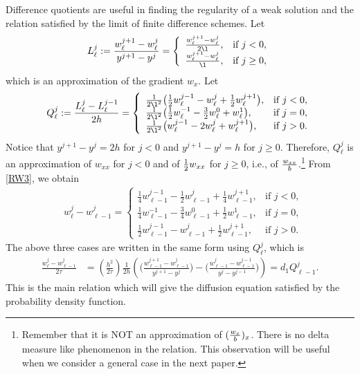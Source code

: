 \documentclass[11pt]{amsart}
\begin{document}
Difference quotients are useful in finding the regularity of a weak solution and the relation satisfied by the limit of finite difference schemes. Let
\begin{equation}\label{Ljl}
L^j_\ell := \frac{w_\ell^{j+1}-w_\ell^j}{y^{j+1}-y^j}
        =\left\{\begin{array}{ll}
        \frac{w^{j+1}_{\ell} - w^{j}_{\ell}}{2\l}, & \text{if $j<0$},\\
        \frac{w^{j+1}_{\ell} - w^{j}_{\ell}}{\l}, & \text{if }  j\ge0,
        \end{array}\right.
\end{equation}
which is an approximation of the gradient $w_x$. Let
\begin{equation}\label{Qjl}
Q^j_\ell := \frac{L^j_\ell-L^{j-1}_\ell}{2h}= \left\{\begin{array}{ll}
        \frac{1}{2\l^2}\big( \frac{1}{2} w^{j-1} _{\ell} - w ^{j} _{\ell} +
        \frac{1}{2} w^{j+1} _{\ell}\big), & \text{if $j<0$},\\
        \frac{1}{2\l^2}\big( \frac{1}{2} w^{-1} _{\ell} - \frac{3}{2}w
        ^{0} _{\ell} +w^{1} _{\ell}\big), & \text{if $j=0$},\\
        \frac{1}{2\l^2}\big(w^{j-1} _{\ell} - 2w^j_\ell + w ^{j+1}
        _{\ell}\big), & \text{if $j>0$}.
        \end{array}\right.
\end{equation}
Notice that $y^{j+1}-y^{j}=2h$ for $j<0$ and $y^{j+1}-y^{j}=h$ for $j\ge0$. Therefore, $Q^j_\ell$ is an approximation of $w_{xx}$ for $j<0$ and of ${1\over2}w_{xx}$ for $j\ge0$, i.e., of ${w_{xx}\over b}$.\footnote{Remember that it is NOT an approximation of $({w_x\over b})_x$. There is no delta measure like phenomenon in the relation. This observation will be useful when we consider a general case in the next paper.} From \eqref{RW3}, we obtain
$$
\begin{aligned}
    &w^{j}_\ell-w^{j}_{\ell-1} = \left\{\begin{array}{ll}
        \frac{1}{4}w^{j-1} _{\ell-1} - \frac{1}{2}w ^{j} _{\ell-1} +
        \frac{1}{4} w^{j+1}_{\ell-1}, & \text{if $j<0$},\\
        \frac{1}{4}w^{-1} _{\ell-1} - \frac{3}{4}w^{0} _{\ell-1} +
        \frac{1}{2}w ^{1} _{\ell-1}, & \text{if $j=0$},\\
        \frac{1}{2}w^{j-1} _{\ell-1}-w^{j}_{\ell-1} + \frac{1}{2}w ^{j+1}
        _{\ell-1}, & \text{if } j>0.
        \end{array}\right.
\end{aligned}
$$
The above three cases are written in the same form using $Q_\ell^j$, which is
\begin{equation} \label{RW1w}
\begin{aligned}
 \frac{w^j_\ell - w^j_{\ell-1}}{2\tau} &= \left(\frac{h^2}{2\tau}\right)
 \frac{1}{2h}\left( \Big(\tfrac{w^{j+1}_{\ell-1} -
 w^{j}_{\ell-1}}{y^{j+1}-y^j}\Big) -\Big(\tfrac{w^{j}_{\ell-1} -
 w^{j-1}_{\ell-1}}{y^{j}-y^{j-1}} \Big)\right)= d_1Q^j_{\ell-1}.
  \end{aligned}
\end{equation}
This is the main relation which will give the diffusion equation satisfied by the probability density function.
\end{document}
